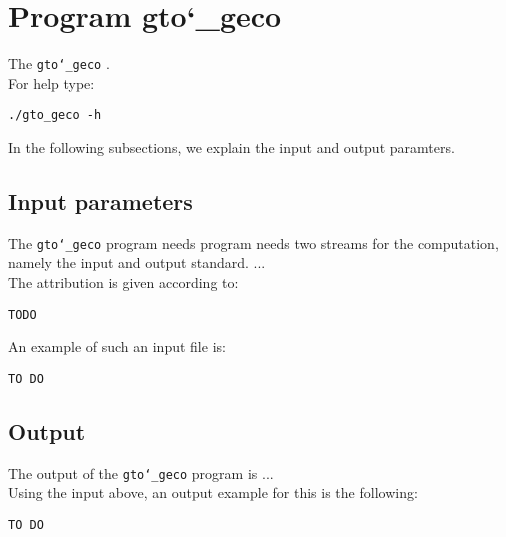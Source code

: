 \section{Program gto\char`_geco}
The \texttt{gto\char`_geco} .\\
For help type:
\begin{lstlisting}
./gto_geco -h
\end{lstlisting}
In the following subsections, we explain the input and output paramters.

\subsection*{Input parameters}

The \texttt{gto\char`_geco} program needs program needs two streams for the computation, namely the input and output standard. ...\\
The attribution is given according to:
\begin{lstlisting}
TODO
\end{lstlisting}
An example of such an input file is:
\begin{lstlisting}
TO DO
\end{lstlisting}

\subsection*{Output}
The output of the \texttt{gto\char`_geco} program is ...\\
Using the input above, an output example for this is the following:
\begin{lstlisting}
TO DO
\end{lstlisting}